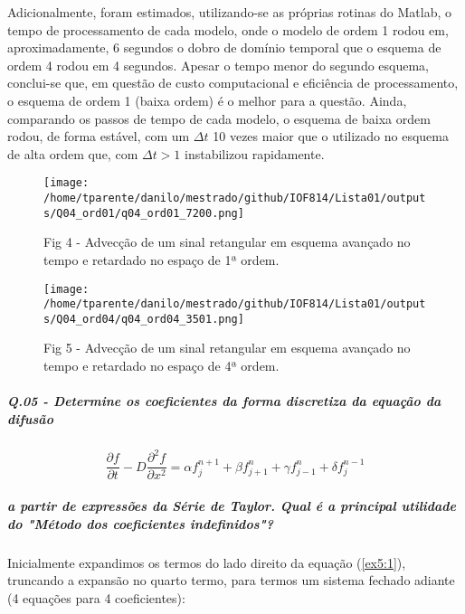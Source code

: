 \documentclass[11pt]{article}
\makeatletter
\def\maxwidth{\ifdim\Gin@nat@width>\linewidth\linewidth
    \else\Gin@nat@width\fi}
\let\Oldincludegraphics\includegraphics
\renewcommand{\includegraphics}[1]{\Oldincludegraphics[width=.8\maxwidth]{#1}}
\makeatother
\begin{document}
Adicionalmente, foram estimados, utilizando-se as próprias rotinas do
Matlab, o tempo de processamento de cada modelo, onde o modelo de ordem
1 rodou em, aproximadamente, 6 segundos o dobro de domínio temporal que
o esquema de ordem 4 rodou em 4 segundos. Apesar o tempo menor do
segundo esquema, conclui-se que, em questão de custo computacional e
eficiência de processamento, o esquema de ordem 1 (baixa ordem) é o
melhor para a questão. Ainda, comparando os passos de tempo de cada
modelo, o esquema de baixa ordem rodou, de forma estável, com um
\(\Delta{t}\) 10 vezes maior que o utilizado no esquema de alta ordem
que, com \(\Delta{t} > 1\) instabilizou rapidamente.

\begin{figure}
\centering
\texttt{[image: /home/tparente/danilo/mestrado/github/IOF814/Lista01/outputs/Q04\_ord01/q04\_ord01\_7200.png]}
\caption{Fig 4 - Advecção de um sinal retangular em esquema avançado no tempo e retardado no espaço de 1ª ordem.}
\label{fig4:1}
\end{figure}

\begin{figure}
\centering
\texttt{[image: /home/tparente/danilo/mestrado/github/IOF814/Lista01/outputs/Q04\_ord04/q04\_ord04\_3501.png]}
  \caption{Fig 5 - Advecção de um sinal retangular em esquema avançado no tempo e retardado no espaço de 4ª ordem.}
\label{fig4:2}
\end{figure}

    \subparagraph{Q.05 - Determine os coeficientes da forma discretiza da
equação da
difusão}
\begin{equation}
    \frac{\partial{f}}{\partial{t}} - D\frac{\partial^2{f}}{\partial{x^2}} = \alpha f^{n+1}_{j} + \beta f^{n}_{j+1} + \gamma f^{n}_{j-1} + \delta f^{n-1}_{j}
    \label{ex5:1}
\end{equation}

\subparagraph{a partir de expressões da Série de Taylor. Qual é a
principal utilidade do "Método dos coeficientes
indefinidos"?}

Inicialmente expandimos os termos do lado direito da equação
(\ref{ex5:1}), truncando a expansão no quarto termo, para termos um
sistema fechado adiante (4 equações para 4 coeficientes):
\end{document}
